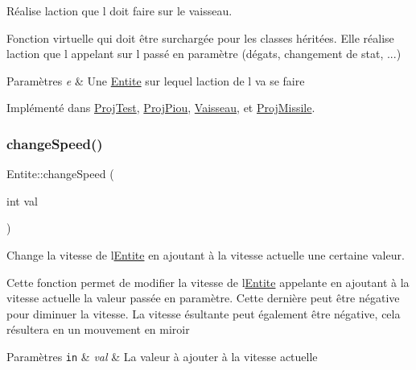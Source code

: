 Réalise l\textquotesingle{}action que l doit faire sur le vaisseau. 

Fonction virtuelle qui doit être surchargée pour les classes héritées. Elle réalise l\textquotesingle{}action que l appelant sur l passé en paramètre (dégats, changement de stat, ...) 
\begin{DoxyParams}{Paramètres}
{\em e} & Une {\ttfamily \hyperlink{class_entite}{Entite}} sur lequel l\textquotesingle{}action de l va se faire \\
\hline
\end{DoxyParams}


Implémenté dans \hyperlink{class_proj_test_a1a20ef0f16a8b58c653a1cf1544ef0b7}{Proj\+Test}, \hyperlink{class_proj_piou_afd492e686378a86e10136061af035a9f}{Proj\+Piou}, \hyperlink{class_vaisseau_a0cd6733845f221c2a5a9d7ccd7f43137}{Vaisseau}, et \hyperlink{class_proj_missile_a8125c442857f7a0fc2d0ff442c39aca7}{Proj\+Missile}.

\mbox{\label{class_entite_abd20483e4d51bc7ebb0eb58bb4366757}} 
\subsubsection{\texorpdfstring{change\+Speed()}{changeSpeed()}}
{\footnotesize\ttfamily Entite\+::change\+Speed (\begin{DoxyParamCaption}\item[{int}]{val }\end{DoxyParamCaption})}



Change la vitesse de l\textquotesingle{}\hyperlink{class_entite}{Entite} en ajoutant à la vitesse actuelle une certaine valeur. 

Cette fonction permet de modifier la vitesse de l\textquotesingle{}\hyperlink{class_entite}{Entite} appelante en ajoutant à la vitesse actuelle la valeur passée en paramètre. Cette dernière peut être négative pour diminuer la vitesse. La vitesse ésultante peut également être négative, cela résultera en un mouvement en miroir 
\begin{DoxyParams}[1]{Paramètres}
\mbox{\tt in}  & {\em val} & La valeur à ajouter à la vitesse actuelle \\
\hline
\end{DoxyParams}
\mbox{\label{class_entite_af5c424f69b2c880ae9c12786abd28592}} 
